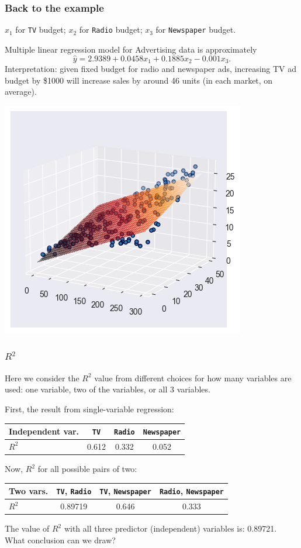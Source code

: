 \documentclass{beamer}
\theoremstyle{example}
\newcommand{\ttt}[1]{{\small\texttt{#1}}}
\begin{document}
\begin{frame}
    \frametitle{Back to the example}
    $x_1$ for \ttt{TV} budget; \quad $x_2$ for \ttt{Radio} budget; \quad $x_3$ for \ttt{Newspaper} budget.
    
    \pause
    Multiple linear regression model for Advertising data is approximately 
        \[\hat{y} = 2.9389 + 0.0458x_1 + 0.1885x_2 - 0.001x_3.\]
    \pause
    Interpretation: given fixed budget for radio and newspaper ads, increasing TV ad budget by \$1000 will increase sales by around 46 units (in each market, on average).

    \centering
    \includegraphics[width=0.4\textheight]{../../Images/multiregression-higherangle.png}
\end{frame}

\begin{frame}
\frametitle{$R^2$}
Here we consider the $R^2$ value from different choices for how many variables are used: one variable, two of the variables, or all 3 variables.

\pause
First, the result from single-variable regression:
\begin{center}
    \begin{tabular}{l c c c}
        Independent var. & \ttt{TV} & \ttt{Radio} & \ttt{Newspaper} \\ 
        \hline 
        $R^2$       &  0.612  &  0.332  &  0.052
    \end{tabular}
\end{center}

\pause
Now, $R^2$ for all possible pairs of two:
\begin{center}
    \begin{tabular}{l c c c}
        Two vars. & \ttt{TV}, \ttt{Radio} & \ttt{TV}, \ttt{Newspaper} & \ttt{Radio}, \ttt{Newspaper} \\ 
        \hline 
        $R^2$       &  0.89719  &  0.646  &  0.333
    \end{tabular}
\end{center}

\pause
The value of $R^2$ with all three predictor (independent) variables is: 0.89721. {\color{strings}What conclusion can we draw?}

\end{frame}
\end{document}
